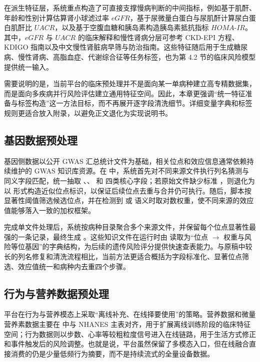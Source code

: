 在派生特征层，系统重点构造了可直接支撑慢病判断的中间指标，例如基于肌酐、年龄和性别计算估算肾小球滤过率 \(eGFR\)，基于尿微量白蛋白与尿肌酐计算尿白蛋白肌酐比 \(UACR\)，以及基于空腹血糖和胰岛素构造胰岛素抵抗指标 \(HOMA\text{-}IR\)。其中，\(eGFR\) 与 \(UACR\) 的临床解释和慢性肾病分层可参考 CKD-EPI 方程、KDIGO 指南以及中文慢性肾脏病早筛与防治指南\cite{inker2021egfr,kdigo2024ckd,ckd2022cn}。这些特征随后用于生成糖尿病、慢性肾病、高脂血症、代谢综合征等任务标签，也为第 4.2 节的临床风险模型提供统一输入。

需要说明的是，当前平台的临床预处理并不是面向某一单病种建立高专精数据集，而是面向多疾病并行风险评估建立通用特征空间。因此，本章更强调“统一特征准备与标签构造”这一方法目标，而不再展开逐字段清洗细节。详细变量字典和标签规则更适合放入附录，以避免正文退化为实现说明书。

\subsection{基因数据预处理}

基因侧数据以公开 GWAS 汇总统计文件为基础，相关位点和效应信息通常依赖持续维护的 GWAS 知识库资源\cite{sollis2023gwascatalog}。在  中，系统首先对不同来源文件执行列名猜测与同义字段匹配，统一抽取 、、 和  四类核心字段；若原始文件缺少标准 ，则退化为以  形式构造近似位点标识，以保证后续位点去重与合并仍可执行。随后，脚本按显著性阈值筛选候选位点，并在检测到  或  语义时取对数权重，使不同来源的效应值能够落入一致的加权框架。

完成单文件处理后，系统按病种目录聚合多个来源文件，并保留每个位点显著性最强的一条记录，最终生成 。这些知识文件在运行时由  读取为“位点 $\rightarrow$ 权重与风险等位基因”的字典结构，为后续的遗传风险评分提供快速查表能力。与原稿中较长的列名修复和清洗流程相比，当前方法更适合概括为字段标准化、显著位点筛选、效应值统一和病种内去重四个步骤。

\subsection{行为与营养数据预处理}

平台在行为与营养模态上采取“离线补充、在线择要使用”的策略。营养数据和微量营养素数据主要在  中与 NHANES 主表对齐，用于扩展离线训练阶段的临床特征空间；行为数据则以步数、心率等较粗粒度信号进入在线链路，用于生活方式修正和事件触发后的风险调整。也就是说，平台虽然保留了多模态入口，但在线融合直接消费的仍是少量低频行为摘要，而不是持续流式的全量设备数据。

